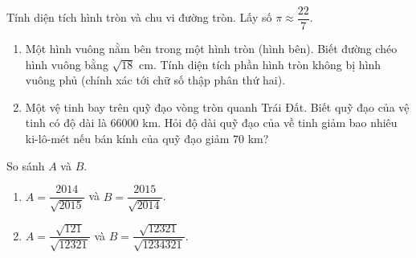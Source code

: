 \begin{bt}%
	Tính diện tích hình tròn và chu vi đường tròn. Lấy số $\pi\approx\dfrac{22}{7}$.
	\begin{enumerate}
		\item Một hình vuông nằm bên trong một hình tròn (hình bên). Biết đường chéo hình vuông bằng $\sqrt{18}$ cm. Tính diện tích phần hình tròn không bị hình vuông phủ (chính xác tới chữ số thập phân thứ hai).
		\item Một vệ tinh bay trên quỹ đạo vòng tròn quanh Trái Đất. Biết quỹ đạo của vệ tinh có độ dài là $66000$ km. Hỏi độ dài quỹ đạo của về tinh giảm bao nhiêu ki-lô-mét nếu bán kính của quỹ đạo giảm $70$ km?
	\end{enumerate}
\end{bt}

\begin{bt}%
	So sánh $A$ và $B$.
	\begin{enumerate}
		\item $A=\dfrac{2014}{\sqrt{2015}}$ và $B=\dfrac{2015}{\sqrt{2014}}$.
		\item $A=\dfrac{\sqrt{121}}{\sqrt{12321}}$ và $B=\dfrac{\sqrt{12321}}{\sqrt{1234321}}$.
	\end{enumerate}
\end{bt}


